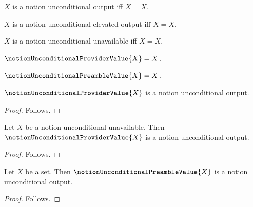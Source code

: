 

\begin{definition}\label{notion_unconditional_output}
    $X$ is a notion unconditional output iff $X=X$.
\end{definition}

\begin{definition}\label{notion_unconditional_elevated_output}
    $X$ is a notion unconditional elevated output iff $X=X$.
\end{definition}

\begin{definition}\label{notion_unconditional_unavailable}
    $X$ is a notion unconditional unavailable iff $X=X$.
\end{definition}

\begin{definition}\label{notion_unconditional_provider_value}
    $\notionUnconditionalProviderValue{X}=X$.
\end{definition}

\begin{definition}\label{notion_unconditional_preamble_value}
    $\notionUnconditionalPreambleValue{X}=X$.
\end{definition}

\begin{classification}\label{notion_unconditional_provider_value_result}
    $\notionUnconditionalProviderValue{X}$ is a notion unconditional output.
\end{classification}
\begin{proof}
    Follows.
\end{proof}

\begin{classification}\label{notion_unconditional_provider_guarded_fallback}
    Let $X$ be a notion unconditional unavailable.
    Then $\notionUnconditionalProviderValue{X}$ is a notion unconditional output.
\end{classification}
\begin{proof}
    Follows.
\end{proof}

\begin{classification}\label{notion_unconditional_preamble_value_result}
    Let $X$ be a set.
    Then $\notionUnconditionalPreambleValue{X}$ is a notion unconditional output.
\end{classification}
\begin{proof}
    Follows.
\end{proof}

